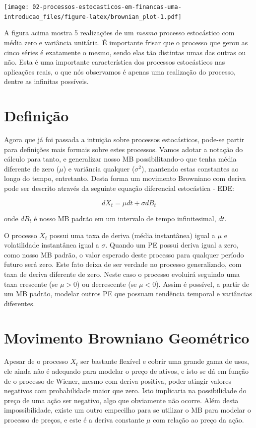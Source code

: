 \documentclass[]{book}
\theoremstyle{definition}
\theoremstyle{definition}
\theoremstyle{definition}
\theoremstyle{remark}
\begin{document}
\texttt{[image: 02-processos-estocasticos-em-financas-uma-introducao\_files/figure-latex/brownian\_plot-1.pdf]}

A figura acima mostra 5 realizações de um \emph{mesmo} processo
estocástico com média zero e variância unitária. É importante frisar que
o processo que gerou as cinco séries é exatamente o mesmo, sendo elas
tão distintas umas das outras ou não. Esta é uma importante
característica dos processos estocásticos nas aplicações reais, o que
nós observamos é apenas uma realização do processo, dentre as infinitas
possíveis.

\section{Definição}\label{definicao}

Agora que já foi passada a intuição sobre processos estocásticos,
pode-se partir para definições mais formais sobre estes processos. Vamos
adotar a notação do cálculo para tanto, e generalizar nosso MB
possibilitando-o que tenha média diferente de zero (\(\mu\)) e variância
qualquer (\(\sigma^2\)), mantendo estas constantes ao longo do tempo,
entretanto. Desta forma um movimento Browniano com deriva pode ser
descrito através da seguinte equação diferencial estocástica - EDE:

\begin{equation}
dX_t = \mu dt + \sigma dB_t
\label{eq:mb}
\end{equation}

onde \(dB_t\) é nosso MB padrão em um intervalo de tempo infinitesimal,
\(dt\).

O processo \(X_t\) possui uma taxa de deriva (média instantânea) igual a
\(\mu\) e volatilidade instantânea igual a \(\sigma\). Quando um PE
possui deriva igual a zero, como nosso MB padrão, o valor esperado deste
processo para qualquer período futuro será zero. Este fato deixa de ser
verdade no processo generalizado, com taxa de deriva diferente de zero.
Neste caso o processo evoluirá seguindo uma taxa crescente (se
\(\mu > 0\)) ou decrescente (se \(\mu < 0\)). Assim é possível, a partir
de um MB padrão, modelar outros PE que possuam tendência temporal e
variâncias diferentes.

\section{Movimento Browniano Geométrico}\label{mbg}

Apesar de o processo \(X_t\) ser bastante flexível e cobrir uma grande
gama de usos, ele ainda não é adequado para modelar o preço de ativos, e
isto se dá em função de o processo de Wiener, mesmo com deriva positiva,
poder atingir valores negativos com probabilidade maior que zero. Isto
implicaria na possibilidade do preço de uma ação ser negativo, algo que
obviamente não ocorre. Além desta impossibilidade, existe um outro
empecilho para se utilizar o MB para modelar o processo de preços, e
este é a deriva constante \(\mu\) com relação ao preço da ação.
\end{document}
